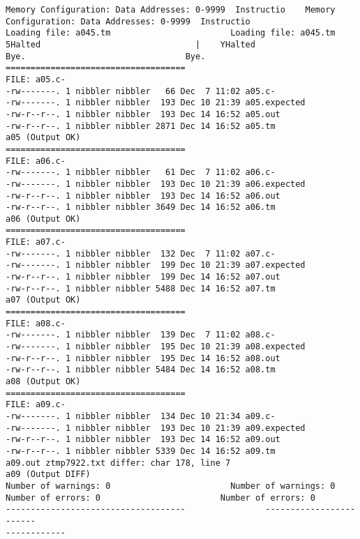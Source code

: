 \documentclass[12pt]{book}
\begin{document}
\begin{lstlisting}
Memory Configuration: Data Addresses: 0-9999  Instructio    Memory 
Configuration: Data Addresses: 0-9999  Instructio
Loading file: a045.tm                        Loading file: a045.tm
5Halted                               |    YHalted
Bye.                                Bye.
====================================
FILE: a05.c-
-rw-------. 1 nibbler nibbler   66 Dec  7 11:02 a05.c-
-rw-------. 1 nibbler nibbler  193 Dec 10 21:39 a05.expected
-rw-r--r--. 1 nibbler nibbler  193 Dec 14 16:52 a05.out
-rw-r--r--. 1 nibbler nibbler 2871 Dec 14 16:52 a05.tm
a05 (Output OK)
====================================
FILE: a06.c-
-rw-------. 1 nibbler nibbler   61 Dec  7 11:02 a06.c-
-rw-------. 1 nibbler nibbler  193 Dec 10 21:39 a06.expected
-rw-r--r--. 1 nibbler nibbler  193 Dec 14 16:52 a06.out
-rw-r--r--. 1 nibbler nibbler 3649 Dec 14 16:52 a06.tm
a06 (Output OK)
====================================
FILE: a07.c-
-rw-------. 1 nibbler nibbler  132 Dec  7 11:02 a07.c-
-rw-------. 1 nibbler nibbler  199 Dec 10 21:39 a07.expected
-rw-r--r--. 1 nibbler nibbler  199 Dec 14 16:52 a07.out
-rw-r--r--. 1 nibbler nibbler 5488 Dec 14 16:52 a07.tm
a07 (Output OK)
====================================
FILE: a08.c-
-rw-------. 1 nibbler nibbler  139 Dec  7 11:02 a08.c-
-rw-------. 1 nibbler nibbler  195 Dec 10 21:39 a08.expected
-rw-r--r--. 1 nibbler nibbler  195 Dec 14 16:52 a08.out
-rw-r--r--. 1 nibbler nibbler 5484 Dec 14 16:52 a08.tm
a08 (Output OK)
====================================
FILE: a09.c-
-rw-------. 1 nibbler nibbler  134 Dec 10 21:34 a09.c-
-rw-------. 1 nibbler nibbler  193 Dec 10 21:39 a09.expected
-rw-r--r--. 1 nibbler nibbler  193 Dec 14 16:52 a09.out
-rw-r--r--. 1 nibbler nibbler 5339 Dec 14 16:52 a09.tm
a09.out ztmp7922.txt differ: char 178, line 7
a09 (Output DIFF)
Number of warnings: 0                        Number of warnings: 0
Number of errors: 0                        Number of errors: 0
------------------------------------                ------------------------
------------


\end{lstlisting}
\end{document}
